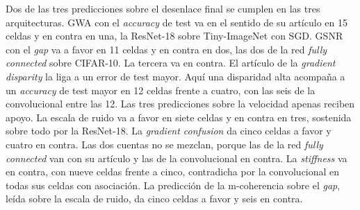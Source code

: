 Dos de las tres predicciones sobre el desenlace final se cumplen en las tres arquitecturas. GWA con el \emph{accuracy} de test va en el sentido de su artículo en 15 celdas y en contra en una, la ResNet-18 sobre Tiny-ImageNet con SGD. GSNR con el \emph{gap} va a favor en 11 celdas y en contra en dos, las dos de la red \emph{fully connected} sobre CIFAR-10. La tercera va en contra. El artículo de la \emph{gradient disparity} la liga a un error de test mayor. Aquí una disparidad alta acompaña a un \emph{accuracy} de test mayor en 12 celdas frente a cuatro, con las seis de la convolucional entre las 12. Las tres predicciones sobre la velocidad apenas reciben apoyo. La escala de ruido va a favor en siete celdas y en contra en tres, sostenida sobre todo por la ResNet-18. La \emph{gradient confusion} da cinco celdas a favor y cuatro en contra. Las dos cuentas no se mezclan, porque las de la red \emph{fully connected} van con su artículo y las de la convolucional en contra. La \emph{stiffness} va en contra, con nueve celdas frente a cinco, contradicha por la convolucional en todas sus celdas con asociación. La predicción de la m-coherencia sobre el \emph{gap}, leída sobre la escala de ruido, da cinco celdas a favor y seis en contra.

